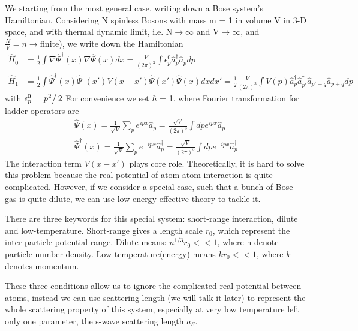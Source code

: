 We starting from the most general case, writing down a Bose system's Hamiltonian. Considering N spinless Bosons with mass m = 1 in volume V in 3-D space, and with thermal dynamic limit, i.e. N$\to \infty $ and V$\to
\infty $, and $\frac{N}{V}=n\to \text{finite}$), we write down the Hamiltonian
\begin{equation}
\begin{split}
\hat{H}_0&=\frac{1}{2}\int\nabla\hat{\Psi}^\dagger(x)\nabla\hat{\Psi }(x)dx=\frac{V}{(2\pi)^3}\int\epsilon_p^0\hat{a}_p^\dagger\hat{a}_pdp\\
\hat{H}_1&=\frac{1}{2}\int\hat{\Psi}^\dagger(x)\hat{\Psi}^\dagger(x')V(x-x')\hat{\Psi}(x')\hat{\Psi}(x)dxdx'=\frac{1}{2}\frac{V}{(2\pi)^3}\int V(p)\hat{a}_p^\dagger\hat{a}_{p'}^\dagger\hat{a}_{p'-q}\hat{a}_{p+q}dp
\end{split}
\end{equation}
with $\epsilon _p^0=\left.p^2\right/2$
For convenience we set $\hbar $ = 1.
where Fourier transformation for ladder operators are
\begin{equation}
\begin{split}
\hat{\Psi}(x)=\frac{1}{\sqrt{V}}\sum_{p}e^{ipx}\hat{a}_p=\frac{\sqrt{V}}{(2\pi)^3}\int dp e^{i p x}\hat{a}_p\\
\hat{\Psi}^\dagger(x)=\frac{1}{\sqrt{V}}\sum_p e^{-i p x}\hat{a}_p^\dagger=\frac{\sqrt{V}}{(2\pi)^3}\int dp e^{-i p x}\hat{a}_p^\dagger
\end{split}
\end{equation}
The interaction term $V(x-x')$ plays core role. Theoretically, it is hard to solve this problem because the real potential of atom-atom interaction is quite complicated. However, if we consider a special case, such that a bunch of Bose gas is quite dilute, we can use low-energy effective theory to tackle it.

There are three keywords for this special system: short-range interaction, dilute and low-temperature. 
Short-range gives a length scale $r_0$, which represent the inter-particle potential range. 
Dilute means: $n^{1/3}r_0<<1$, where n denote particle number density. 
Low temperature(energy) means $k r_0<<1$, where $k$ denotes momentum.

These three conditions allow us to ignore the complicated real potential between atoms, instead we can use scattering length (we will talk it later) to represent the whole scattering property of this system, especially at very low temperature left only one parameter, the s-wave scattering length $a_S$.

